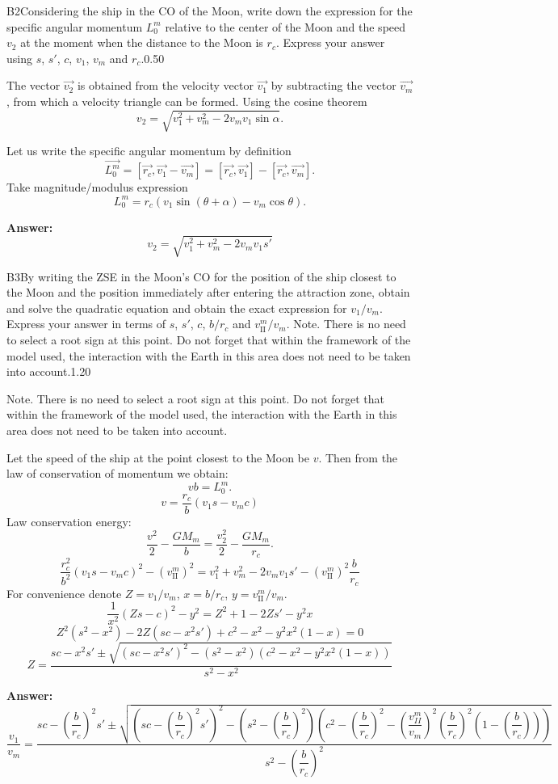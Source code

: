 \documentclass[11pt,a4paper]{article}
\begin{document}
\begin{solcard}{B2}{Considering the ship in the CO of the Moon, write down the expression for the specific angular momentum $L_0^m$ relative to the center of the Moon and the speed $v_2$ at the moment when the distance to the Moon is $r_c$. Express your answer using $s$, $s'$, $c$, $v_1$, $v_m$ and $r_c$.}{0.50}

The vector $\vec{v_2}$ is obtained from the velocity vector $\vec{v_1}$ by subtracting the vector $\vec{v_m}$, from which a velocity triangle can be formed. Using the cosine theorem $$v_2 = \sqrt{v_1^2+v_m^2-2v_mv_1\sin\alpha}.$$


Let us write the specific angular momentum by definition $$\vec{L_0^m}=\left[\vec{r_c},\vec{v_1}-\vec{v_m}\right]=\left[\vec{r_c},\vec{v_1}\right]- \left[\vec{r_c},\vec{v_m}\right].$$Take magnitude/modulus expression $$L_0^m = r_c\left(v_1\sin(\theta+\alpha) - v_m\cos\theta\right).$$

\par\smallskip\noindent\textbf{Answer:} $$v_2 = \sqrt{v_1^2+v_m^2-2v_mv_1 s'}$$
\end{solcard}

\begin{solcard}{B3}{By writing the ZSE in the Moon's CO for the position of the ship closest to the Moon and the position immediately after entering the attraction zone, obtain and solve the quadratic equation and obtain the exact expression for $v_1/v_m$. Express your answer in terms of $s$, $s'$, $c$, $b/r_c$ and $v_\text{II}^m/v_m$. Note. There is no need to select a root sign at this point. Do not forget that within the framework of the model used, the interaction with the Earth in this area does not need to be taken into account.}{1.20}

Note. There is no need to select a root sign at this point. Do not forget that within the framework of the model used, the interaction with the Earth in this area does not need to be taken into account.


Let the speed of the ship at the point closest to the Moon be $v$. Then from the law of conservation of momentum we obtain: $$vb = L_0^m.$$$$v = \frac{r_c}{b}\left(v_1s - v_mc\right)$$Law conservation energy: $$\frac{v^2}{2} - \frac{GM_m}{b} = \frac{v_2^2}{2} - \frac{GM_m}{r_c}.$$$$\frac{r_c^2}{b^2}\left(v_1s - v_mc\right)^2 - \left(v_\text{II}^m\right)^2 = v_1^2+v_m^2-2v_mv_1 s' - \left(v_\text{II}^m\right)^2\frac{b}{r_c}$$For convenience denote $Z = v_1/v_m$, $x = b/r_c$, $y = v_\text{II}^m/v_m$. $$\frac{1}{x^2}\left(Zs - c\right)^2 - y^2 = Z^2+1-2Z s' - y^2x$$$$Z^2 \left(s^2-x^2\right) - 2Z\left(sc-x^2s'\right)+c^2-x^2-y^2x^2(1-x) = 0$$$$Z = \frac{sc-x^2s'\pm\sqrt{(sc-x^2s')^2-(s^2-x^2)(c^2-x^2-y^2x^2(1-x))}}{s^2-x^2}$$

\par\smallskip\noindent\textbf{Answer:} $$\dfrac{v_1}{v_m} = \frac{sc-\left(\dfrac{b}{r_c}\right)^2s'\pm\sqrt{\left(sc-\left(\dfrac{b}{r_c}\right)^2s'\right)^2-\left(s^2-\left(\dfrac{b}{r_c}\right)^2\right)\left(c^2-\left(\dfrac{b}{r_c}\right)^2-\left(\dfrac{v_{II}^m}{v_m}\right)^2\left(\dfrac{b}{r_c}\right)^2\left(1-\left(\dfrac{b}{r_c}\right)\right)\right)}}{s^2-\left(\dfrac{b}{r_c}\right)^2}$$
\end{solcard}
\end{document}
